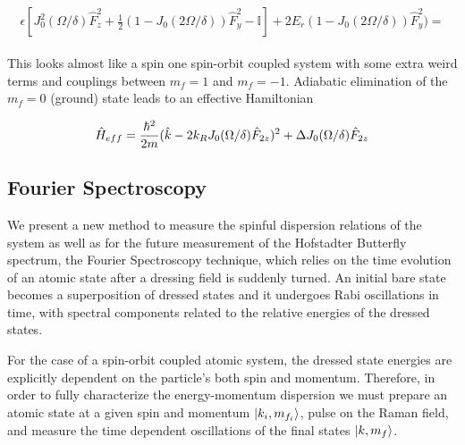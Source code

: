 \begin{align}
	\begin{split}
		\epsilon[J_0^2(\Omega/\delta)\hat{F}_z^2 + \frac{1}{2}(1-J_0(2\Omega/\delta))\hat{F}_y^2-\mathbb{I}]+2E_r (1-J_0(2\Omega/\delta))\hat{F}_y^2) = 
	\end{split}
\end{align}


This looks almost like a spin one spin-orbit coupled system with some extra weird terms and couplings between $m_f=1$ and $m_f= -1$. Adiabatic elimination of the $m_f=0$ (ground) state leads to an effective Hamiltonian

\begin{align}
	\hat{H}_{eff} = \frac{\hbar^2}{2m}(\hat{k} - 2{{k_R}}     J_0(\Omega/\delta)\hat{F}_{2z})^2 + \Delta J_0(\Omega/\delta)\hat{F}_{2z}
\end{align}


\subsection{Fourier Spectroscopy}		

We present a new method to measure the spinful dispersion relations of the system as well as for the future measurement of the Hofstadter Butterfly spectrum, the Fourier Spectroscopy technique, which relies on the time evolution of an atomic state after a dressing field is suddenly turned. An initial bare state becomes a superposition of dressed states and it undergoes Rabi oscillations in time, with spectral components related to the relative energies of the dressed states. 


For the case of a spin-orbit coupled atomic system, the dressed state energies are explicitly dependent on the particle's both spin and momentum. Therefore, in order to fully characterize the energy-momentum dispersion we must prepare an atomic state at a given spin and momentum $|k_i,m_{f_i}\rangle$, pulse on the Raman field, and measure the time dependent oscillations of the final states $|k,m_f\rangle$. %

